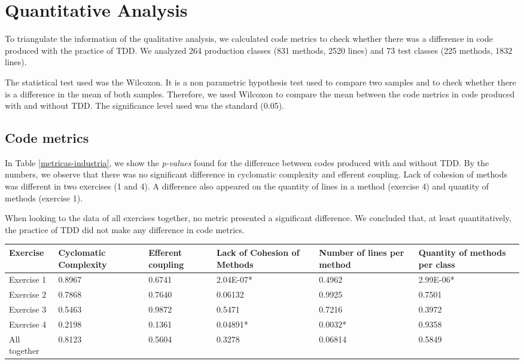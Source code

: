 \documentclass[times]{speauth}
\begin{document}
\section{Quantitative Analysis}

To triangulate the information of the qualitative analysis, we calculated
code metrics to check whether there was a difference in code produced
with the practice of TDD.
We analyzed
264 production classes (831 methods, 2520 lines) and
73 test classes (225 methods, 1832 lines).

The statistical test used was the Wilcoxon. It is a non parametric hypothesis test
used to compare two samples and to check whether there is a difference in the mean
of both samples. Therefore, we used Wilcoxon to compare the mean between
the code metrics in code produced with and without TDD. The significance level
used was the standard (0.05).


\subsection{Code metrics}

In Table \ref{metricas-industria}, we show the \textit{p-values} found for
the difference between codes produced with and without TDD. By the numbers,
we observe that there was no significant difference in cyclomatic complexity
and efferent coupling.
Lack of cohesion of methods was different in two exercises (1 and 4). A difference
also appeared on the quantity of lines in a method (exercise 4) and quantity of
methods (exercise 1).

When looking to the data of all exercises together, no metric presented a significant
difference. We concluded that, at least quantitatively, the practice of TDD did not
make any difference in code metrics.

\begin{table*}
	\centering
	\begin{tabular}{ | p{2cm} | p{2cm} | p{1.7cm} | p{2cm} | p{1.7cm} | p{1.7cm} |}
		\hline
		\textbf{Exercise} & \textbf{Cyclomatic Complexity} & \textbf{Efferent coupling} & \textbf{Lack of Cohesion of Methods} & \textbf{Number of lines per method} 
		& \textbf{Quantity of methods per class} \\
		\hline
		Exercise 1 &	0.8967	&	0.6741 &	\cellcolor[gray]{0.8}2.04E-07* &	0.4962 &	\cellcolor[gray]{0.8}2.99E-06* \\
		Exercise 2	& 0.7868	&	0.7640 &	0.06132 &	0.9925 &	0.7501 \\
		Exercise 3	& 0.5463	&	0.9872 &	0.5471 &	0.7216 &	0.3972\\
		Exercise 4	& 0.2198	&	0.1361 &	\cellcolor[gray]{0.8}0.04891* &	\cellcolor[gray]{0.8}0.0032* &	0.9358\\
		\hline
		All together &	0.8123	&	0.5604 &	0.3278 &	0.06814 &	0.5849\\
		\hline
	\end{tabular}
	\caption{\textit{P-values} found for the difference between code produced with and without TDD}
	\label{metricas-industria}
\end{table*}
\end{document}
